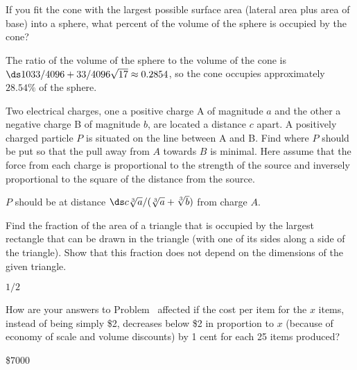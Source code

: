 \begin{exercises}
\exercise
If you fit the cone with the largest possible surface area (lateral area
plus area of base) into a sphere, what percent of the volume of the
sphere is occupied by the cone?  
\begin{answer} The ratio of the volume of the sphere to the volume of the
cone is $\ds 1033/4096+33/4096\sqrt{17}\approx 0.2854$, so the cone
occupies approximately $28.54\%$ of the sphere.
\end{answer}

\exercise
Two electrical charges, one a positive charge A of magnitude $a$ and the
other a negative charge B of magnitude $b$, are located a distance $c$
apart.  A positively charged particle $P$ is situated on the line between A
and B.  Find where $P$ should be put so that the pull away from $A$ towards
$B$ is minimal.  Here assume that the force from each charge is
proportional to the strength of the source and inversely proportional to
the square of the distance from the source.
\begin{answer} $P$ should be at distance $\ds c\root 3\of {a} /
(\root 3\of {a} + \root 3\of {b})$ from charge $A$.
\end{answer}

\exercise
Find the fraction of the area of a triangle that is occupied by the largest
rectangle that can be drawn in the triangle (with one of its sides along a
side of the triangle).  Show that this fraction does not depend on the
dimensions of the given triangle.
\begin{answer} $1/2$
\end{answer}

\exercise
How are your answers to Problem~
 affected if the cost per item for the $x$
items, instead of being simply \$2, decreases below \$2 in proportion to
$x$ (because of economy of scale and volume discounts) by 1 cent for each
25 items produced?
\begin{answer} \$7000
\end{answer}


\end{exercises}
